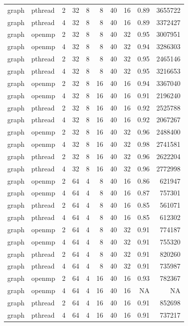 \documentclass[a4paper]{article}
\begin{document}
{\begin{longtable}{lllrrrrrrr}
graph & pthread & 2 & 32 & 8 & 8 & 40 & 16 & 0.89 & 3655722 \\
graph & pthread & 4 & 32 & 8 & 8 & 40 & 16 & 0.89 & 3372427 \\
graph & openmp & 2 & 32 & 8 & 8 & 40 & 32 & 0.95 & 3007951 \\
graph & openmp & 4 & 32 & 8 & 8 & 40 & 32 & 0.94 & 3286303 \\
graph & pthread & 2 & 32 & 8 & 8 & 40 & 32 & 0.95 & 2465146 \\
graph & pthread & 4 & 32 & 8 & 8 & 40 & 32 & 0.95 & 3216653 \\
graph & openmp & 2 & 32 & 8 & 16 & 40 & 16 & 0.94 & 3367040 \\
graph & openmp & 4 & 32 & 8 & 16 & 40 & 16 & 0.91 & 2196240 \\
graph & pthread & 2 & 32 & 8 & 16 & 40 & 16 & 0.92 & 2525788 \\
graph & pthread & 4 & 32 & 8 & 16 & 40 & 16 & 0.92 & 2067267 \\
graph & openmp & 2 & 32 & 8 & 16 & 40 & 32 & 0.96 & 2488400 \\
graph & openmp & 4 & 32 & 8 & 16 & 40 & 32 & 0.98 & 2741581 \\
graph & pthread & 2 & 32 & 8 & 16 & 40 & 32 & 0.96 & 2622204 \\
graph & pthread & 4 & 32 & 8 & 16 & 40 & 32 & 0.96 & 2772998 \\
graph & openmp & 2 & 64 & 4 & 8 & 40 & 16 & 0.86 & 621947 \\
graph & openmp & 4 & 64 & 4 & 8 & 40 & 16 & 0.87 & 757301 \\
graph & pthread & 2 & 64 & 4 & 8 & 40 & 16 & 0.85 & 561071 \\
graph & pthread & 4 & 64 & 4 & 8 & 40 & 16 & 0.85 & 612302 \\
graph & openmp & 2 & 64 & 4 & 8 & 40 & 32 & 0.91 & 774187 \\
graph & openmp & 4 & 64 & 4 & 8 & 40 & 32 & 0.91 & 755320 \\
graph & pthread & 2 & 64 & 4 & 8 & 40 & 32 & 0.91 & 820260 \\
graph & pthread & 4 & 64 & 4 & 8 & 40 & 32 & 0.91 & 735987 \\
graph & openmp & 2 & 64 & 4 & 16 & 40 & 16 & 0.93 & 782367 \\
graph & openmp & 4 & 64 & 4 & 16 & 40 & 16 & NA & NA \\
graph & pthread & 2 & 64 & 4 & 16 & 40 & 16 & 0.91 & 852698 \\
graph & pthread & 4 & 64 & 4 & 16 & 40 & 16 & 0.91 & 737217 \\

\end{longtable}}
\end{document}
